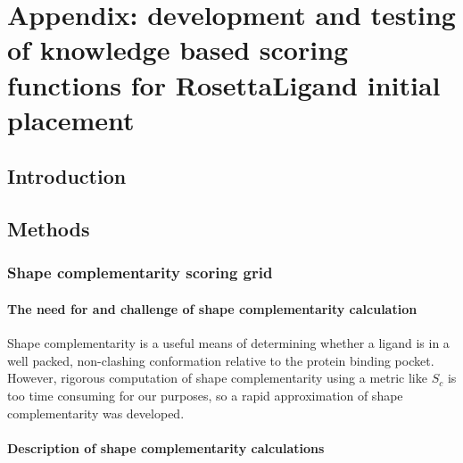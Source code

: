 \chapter{Appendix: development and testing of knowledge based scoring functions for RosettaLigand initial placement}

\section{Introduction}



\section{Methods}

\subsection{Shape complementarity scoring grid}

\subsubsection{The need for and challenge of shape complementarity calculation}

Shape complementarity is a useful means of determining whether a ligand is in a well packed, non-clashing conformation relative to the protein binding pocket. 
However, rigorous computation of shape complementarity using a metric like $S_{c}$\citep{Lawrence:1993in}  is too time consuming for our purposes, so a rapid approximation of shape complementarity was developed.

\subsubsection{Description of shape complementarity calculations}

